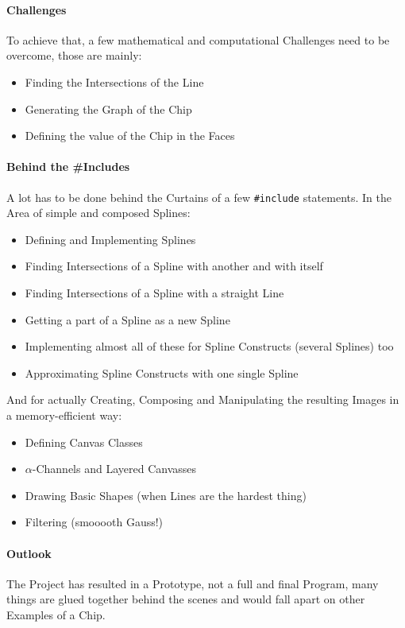 \documentclass[10pt]{article}
\begin{document}
\paragraph{Challenges}
    To achieve that, a few mathematical and computational Challenges need to be overcome, those are mainly:
    \begin{itemize}
        \item Finding the Intersections of the Line
        \item Generating the Graph of the Chip
        \item Defining the value of the Chip in the Faces
    \end{itemize}
\paragraph{Behind the \#Includes}
    A lot has to be done behind the Curtains of a few {\tt \#include} statements.
    In the Area of simple and composed Splines:
    \begin{itemize}
        \item Defining and Implementing Splines
        \item Finding Intersections of a Spline with another and with itself
        \item Finding Intersections of a Spline with a straight Line
        \item Getting a part of a Spline as a new Spline
        \item Implementing almost all of these for Spline Constructs (several Splines) too
        \item Approximating Spline Constructs with one single Spline
    \end{itemize}
    And for actually Creating, Composing and Manipulating the resulting Images in a memory-efficient way:
    \begin{itemize}
        \item Defining Canvas Classes
        \item $\alpha$-Channels and Layered Canvasses
        \item Drawing Basic Shapes (when Lines are the hardest thing)
        \item Filtering (smooooth Gauss!)
    \end{itemize}
\paragraph{Outlook}
    The Project has resulted in a Prototype, not a full and final Program, many things are glued together behind the scenes and would fall apart on other Examples of a Chip.
\end{document}

